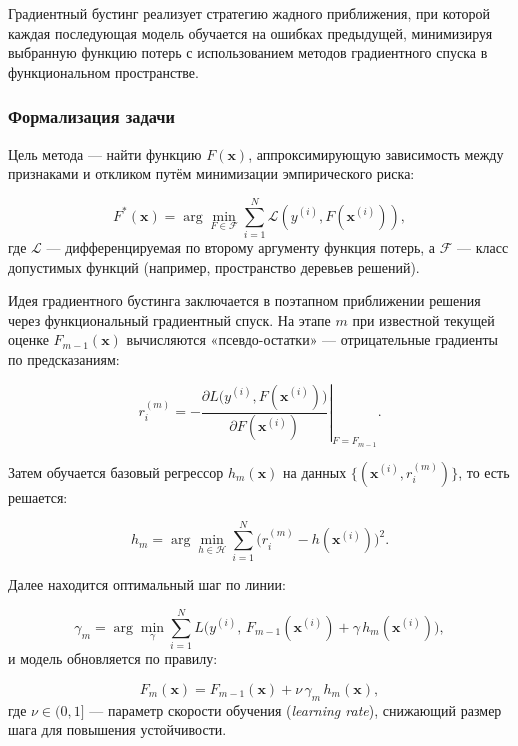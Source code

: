 Градиентный бустинг реализует стратегию жадного приближения, при которой каждая последующая модель обучается на ошибках предыдущей, минимизируя выбранную функцию потерь с использованием методов градиентного спуска в функциональном пространстве.

\subsubsection{Формализация задачи}

Цель метода --- найти функцию $F(\mathbf{x})$, аппроксимирующую зависимость между признаками и откликом путём минимизации эмпирического риска:

\begin{equation}
F^*(\mathbf{x}) = \arg\min_{F \in \mathcal{F}} \sum_{i=1}^{N} \mathcal{L}(y^{(i)}, F(\mathbf{x}^{(i)})),
\end{equation}
где $\mathcal{L}$ — дифференцируемая по второму аргументу функция потерь, а $\mathcal{F}$ — класс допустимых функций (например, пространство деревьев решений).

Идея градиентного бустинга заключается в поэтапном приближении решения через функциональный градиентный спуск. На этапе $m$ при известной текущей оценке $F_{m-1}(\mathbf{x})$ вычисляются «псевдо-остатки» --- отрицательные градиенты по предсказаниям:

\begin{equation}
r_i^{(m)} = -\left.\frac{\partial L\bigl(y^{(i)},F(\mathbf{x}^{(i)})\bigr)}{\partial F(\mathbf{x}^{(i)})}\right|_{F=F_{m-1}}.
\end{equation}

Затем обучается базовый регрессор $h_m(\mathbf{x})$ на данных $\{(\mathbf{x}^{(i)},r_i^{(m)})\}$, то есть решается:

\begin{equation}
h_m = \arg\min_{h\in\mathcal{H}} \sum_{i=1}^N \bigl(r_i^{(m)} - h(\mathbf{x}^{(i)})\bigr)^2.
\end{equation}

Далее находится оптимальный шаг по линии:

\begin{equation}
\gamma_m = \arg\min_{\gamma} \sum_{i=1}^N L\bigl(y^{(i)},\,F_{m-1}(\mathbf{x}^{(i)}) + \gamma\,h_m(\mathbf{x}^{(i)})\bigr),
\end{equation}
и модель обновляется по правилу:

\begin{equation}
F_m(\mathbf{x}) = F_{m-1}(\mathbf{x}) + \nu\,\gamma_m\,h_m(\mathbf{x}),
\end{equation}
где $\nu \in (0,1]$ — параметр скорости обучения (\textit{learning rate}), снижающий размер шага для повышения устойчивости.

